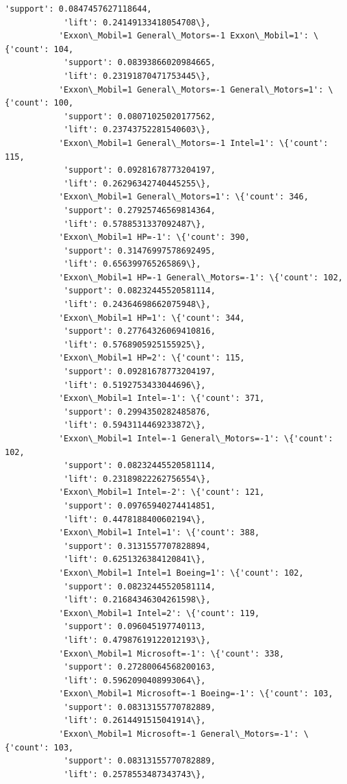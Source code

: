 \documentclass[11pt]{article}
\begin{document}
\begin{Verbatim}[commandchars=\\\{\}]
            'support': 0.0847457627118644,
            'lift': 0.24149133418054708\},
           'Exxon\_Mobil=1 General\_Motors=-1 Exxon\_Mobil=1': \{'count': 104,
            'support': 0.08393866020984665,
            'lift': 0.23191870471753445\},
           'Exxon\_Mobil=1 General\_Motors=-1 General\_Motors=1': \{'count': 100,
            'support': 0.08071025020177562,
            'lift': 0.23743752281540603\},
           'Exxon\_Mobil=1 General\_Motors=-1 Intel=1': \{'count': 115,
            'support': 0.09281678773204197,
            'lift': 0.26296342740445255\},
           'Exxon\_Mobil=1 General\_Motors=1': \{'count': 346,
            'support': 0.27925746569814364,
            'lift': 0.5788531337092487\},
           'Exxon\_Mobil=1 HP=-1': \{'count': 390,
            'support': 0.31476997578692495,
            'lift': 0.656399765265869\},
           'Exxon\_Mobil=1 HP=-1 General\_Motors=-1': \{'count': 102,
            'support': 0.08232445520581114,
            'lift': 0.24364698662075948\},
           'Exxon\_Mobil=1 HP=1': \{'count': 344,
            'support': 0.27764326069410816,
            'lift': 0.5768905925155925\},
           'Exxon\_Mobil=1 HP=2': \{'count': 115,
            'support': 0.09281678773204197,
            'lift': 0.5192753433044696\},
           'Exxon\_Mobil=1 Intel=-1': \{'count': 371,
            'support': 0.2994350282485876,
            'lift': 0.5943114469233872\},
           'Exxon\_Mobil=1 Intel=-1 General\_Motors=-1': \{'count': 102,
            'support': 0.08232445520581114,
            'lift': 0.23189822262756554\},
           'Exxon\_Mobil=1 Intel=-2': \{'count': 121,
            'support': 0.09765940274414851,
            'lift': 0.4478188400602194\},
           'Exxon\_Mobil=1 Intel=1': \{'count': 388,
            'support': 0.3131557707828894,
            'lift': 0.6251326384120841\},
           'Exxon\_Mobil=1 Intel=1 Boeing=1': \{'count': 102,
            'support': 0.08232445520581114,
            'lift': 0.21684346304261598\},
           'Exxon\_Mobil=1 Intel=2': \{'count': 119,
            'support': 0.096045197740113,
            'lift': 0.47987619122012193\},
           'Exxon\_Mobil=1 Microsoft=-1': \{'count': 338,
            'support': 0.27280064568200163,
            'lift': 0.5962090408993064\},
           'Exxon\_Mobil=1 Microsoft=-1 Boeing=-1': \{'count': 103,
            'support': 0.08313155770782889,
            'lift': 0.2614491515041914\},
           'Exxon\_Mobil=1 Microsoft=-1 General\_Motors=-1': \{'count': 103,
            'support': 0.08313155770782889,
            'lift': 0.2578553487343743\},

\end{Verbatim}
\end{document}
